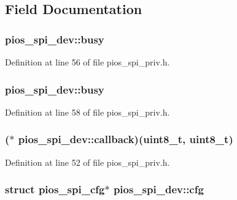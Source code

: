 \subsection{Field Documentation}
\hypertarget{structpios__spi__dev_a3fcabfcfba2df1b74edfeacd5b0f4a5e}{
\subsubsection[{busy}]{ pios\-\_\-spi\-\_\-dev\-::busy}}\label{structpios__spi__dev_a3fcabfcfba2df1b74edfeacd5b0f4a5e}


Definition at line 56 of file pios\-\_\-spi\-\_\-priv.\-h.

\hypertarget{structpios__spi__dev_a90778ce216b2c078f3c6dade52f3f2be}{
\subsubsection[{busy}]{ pios\-\_\-spi\-\_\-dev\-::busy}}\label{structpios__spi__dev_a90778ce216b2c078f3c6dade52f3f2be}


Definition at line 58 of file pios\-\_\-spi\-\_\-priv.\-h.

\hypertarget{structpios__spi__dev_a15f1ecafedc8c12d37bf9bf066b993c6}{
\subsubsection[{callback}]{($\ast$ pios\-\_\-spi\-\_\-dev\-::callback)({\bf uint8\-\_\-t}, {\bf uint8\-\_\-t})}}\label{structpios__spi__dev_a15f1ecafedc8c12d37bf9bf066b993c6}


Definition at line 52 of file pios\-\_\-spi\-\_\-priv.\-h.

\hypertarget{structpios__spi__dev_afcd7e74a6f561b546a7b828466a12f94}{
\subsubsection[{cfg}]{\setlength{\rightskip}{0pt plus 5cm}struct {\bf pios\-\_\-spi\-\_\-cfg}$\ast$ pios\-\_\-spi\-\_\-dev\-::cfg}}\label{structpios__spi__dev_afcd7e74a6f561b546a7b828466a12f94}


